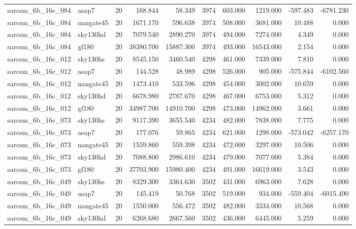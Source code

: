 \begin{longtable}{llrrrrrrrr}
sarcsm\_6b\_16c\_084 & asap7 & 20 & 168.844 & 58.349 & 3974 & 603.000 & 1219.000 & -597.483 & -6781.230 \\
sarcsm\_6b\_16c\_084 & nangate45 & 20 & 1671.170 & 596.638 & 3974 & 508.000 & 3681.000 & 10.488 & 0.000 \\
sarcsm\_6b\_16c\_084 & sky130hd & 20 & 7079.540 & 2890.270 & 3974 & 494.000 & 7274.000 & 4.349 & 0.000 \\
sarcsm\_6b\_16c\_084 & gf180 & 20 & 38380.700 & 15887.300 & 3974 & 493.000 & 16543.000 & 2.154 & 0.000 \\
sarcsm\_6b\_16c\_012 & sky130hs & 20 & 8545.150 & 3460.540 & 4298 & 461.000 & 7339.000 & 7.810 & 0.000 \\
sarcsm\_6b\_16c\_012 & asap7 & 20 & 144.528 & 48.989 & 4298 & 526.000 & 905.000 & -575.844 & -6102.560 \\
sarcsm\_6b\_16c\_012 & nangate45 & 20 & 1473.410 & 533.596 & 4298 & 454.000 & 3002.000 & 10.659 & 0.000 \\
sarcsm\_6b\_16c\_012 & sky130hd & 20 & 6678.980 & 2787.670 & 4298 & 467.000 & 6753.000 & 5.312 & 0.000 \\
sarcsm\_6b\_16c\_012 & gf180 & 20 & 34987.700 & 14910.700 & 4298 & 473.000 & 14962.000 & 3.661 & 0.000 \\
sarcsm\_6b\_16c\_073 & sky130hs & 20 & 9117.390 & 3655.540 & 4234 & 482.000 & 7838.000 & 7.775 & 0.000 \\
sarcsm\_6b\_16c\_073 & asap7 & 20 & 177.076 & 59.865 & 4234 & 621.000 & 1298.000 & -573.042 & -6257.170 \\
sarcsm\_6b\_16c\_073 & nangate45 & 20 & 1559.860 & 559.398 & 4234 & 472.000 & 3297.000 & 10.506 & 0.000 \\
sarcsm\_6b\_16c\_073 & sky130hd & 20 & 7088.800 & 2986.610 & 4234 & 479.000 & 7077.000 & 5.384 & 0.000 \\
sarcsm\_6b\_16c\_073 & gf180 & 20 & 37703.900 & 15980.400 & 4234 & 491.000 & 16619.000 & 3.543 & 0.000 \\
sarcsm\_6b\_16c\_049 & sky130hs & 20 & 8329.300 & 3364.630 & 3502 & 431.000 & 6963.000 & 7.628 & 0.000 \\
sarcsm\_6b\_16c\_049 & asap7 & 20 & 145.419 & 50.768 & 3502 & 519.000 & 934.000 & -559.404 & -6015.490 \\
sarcsm\_6b\_16c\_049 & nangate45 & 20 & 1550.000 & 556.472 & 3502 & 482.000 & 3334.000 & 10.568 & 0.000 \\
sarcsm\_6b\_16c\_049 & sky130hd & 20 & 6268.680 & 2667.560 & 3502 & 436.000 & 6445.000 & 5.259 & 0.000 \\

\end{longtable}
